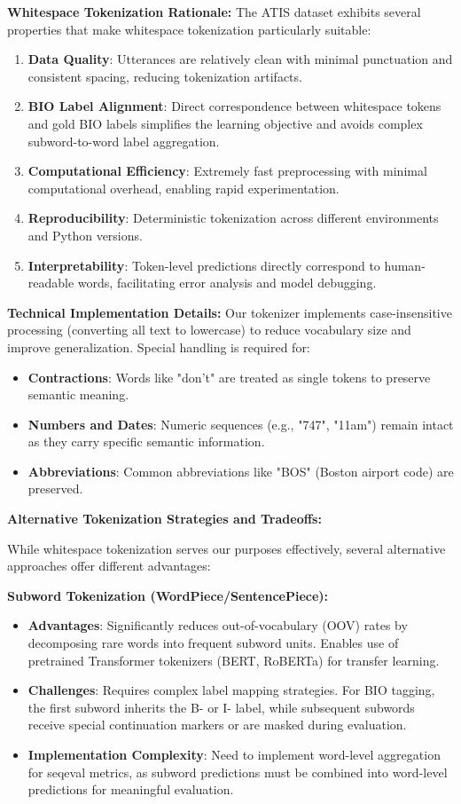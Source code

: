 \documentclass[conference]{IEEEtran}
\begin{document}
\textbf{Whitespace Tokenization Rationale:}
The ATIS dataset exhibits several properties that make whitespace tokenization particularly suitable:
\begin{enumerate}
  \item \textbf{Data Quality}: Utterances are relatively clean with minimal punctuation and consistent spacing, reducing tokenization artifacts.
  \item \textbf{BIO Label Alignment}: Direct correspondence between whitespace tokens and gold BIO labels simplifies the learning objective and avoids complex subword-to-word label aggregation.
  \item \textbf{Computational Efficiency}: Extremely fast preprocessing with minimal computational overhead, enabling rapid experimentation.
  \item \textbf{Reproducibility}: Deterministic tokenization across different environments and Python versions.
  \item \textbf{Interpretability}: Token-level predictions directly correspond to human-readable words, facilitating error analysis and model debugging.
\end{enumerate}

\textbf{Technical Implementation Details:}
Our tokenizer implements case-insensitive processing (converting all text to lowercase) to reduce vocabulary size and improve generalization. Special handling is required for:
\begin{itemize}
  \item \textbf{Contractions}: Words like "don't" are treated as single tokens to preserve semantic meaning.
  \item \textbf{Numbers and Dates}: Numeric sequences (e.g., "747", "11am") remain intact as they carry specific semantic information.
  \item \textbf{Abbreviations}: Common abbreviations like "BOS" (Boston airport code) are preserved.
\end{itemize}

\textbf{Alternative Tokenization Strategies and Tradeoffs:}

While whitespace tokenization serves our purposes effectively, several alternative approaches offer different advantages:

\textbf{Subword Tokenization (WordPiece/SentencePiece):}
\begin{itemize}
  \item \textbf{Advantages}: Significantly reduces out-of-vocabulary (OOV) rates by decomposing rare words into frequent subword units. Enables use of pretrained Transformer tokenizers (BERT, RoBERTa) for transfer learning.
  \item \textbf{Challenges}: Requires complex label mapping strategies. For BIO tagging, the first subword inherits the B- or I- label, while subsequent subwords receive special continuation markers or are masked during evaluation.
  \item \textbf{Implementation Complexity}: Need to implement word-level aggregation for seqeval metrics, as subword predictions must be combined into word-level predictions for meaningful evaluation.
\end{itemize}
\end{document}
